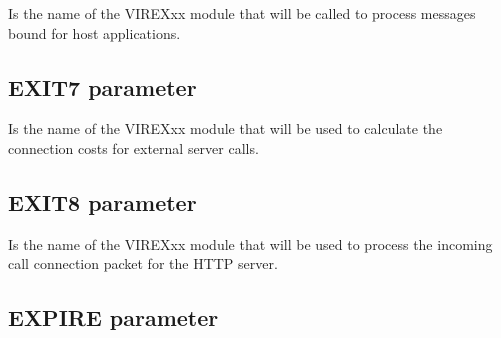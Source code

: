 \documentclass[letterpaper,10pt,english]{sphinxmanual}
\begin{document}
\sphinxAtStartPar
{} \sphinxhyphen{} Is the name of the VIREXxx module that will be called to process messages bound for host applications.

\ignorespaces 

\subsection{EXIT7 parameter}
\label{\detokenize{Installation_Guide:exit7-parameter}}\label{\detokenize{Installation_Guide:index-61}}
\begin{sphinxVerbatim}[commandchars=\\\{\}]
 
\end{sphinxVerbatim}

\sphinxAtStartPar
{} \sphinxhyphen{} Is the name of the VIREXxx module that will be used to calculate the connection costs for external server calls.

\ignorespaces 

\subsection{EXIT8 parameter}
\label{\detokenize{Installation_Guide:exit8-parameter}}\label{\detokenize{Installation_Guide:index-62}}
\begin{sphinxVerbatim}[commandchars=\\\{\}]
 
\end{sphinxVerbatim}

\sphinxAtStartPar
{} \sphinxhyphen{} Is the name of the VIREXxx module that will be used to process the incoming call connection packet for the HTTP server.

\ignorespaces 

\subsection{EXPIRE parameter}
\label{\detokenize{Installation_Guide:expire-parameter}}\label{\detokenize{Installation_Guide:index-63}}
\begin{sphinxVerbatim}[commandchars=\\\{\}]
 
\end{sphinxVerbatim}
\end{document}
